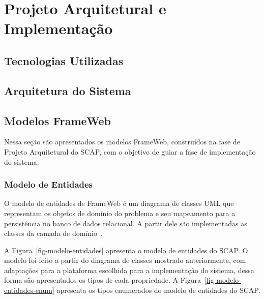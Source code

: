 \chapter{Projeto Arquitetural e Implementação}
\label{chap-projeto}


\section{Tecnologias Utilizadas}
\label{sec-projeto-tecnologias}


\section{Arquitetura do Sistema}
\label{sec-projeto-arquitetura}


\section{Modelos FrameWeb}
\label{sec-projeto-frameweb}

Nessa seção são apresentados os modelos FrameWeb, construídos na fase de Projeto Arquitetural
do SCAP, com o objetivo de guiar a fase de implementação do sistema.

\subsection{Modelo de Entidades}
\label{subsec-frameweb-entidades}
O modelo de entidades de FrameWeb é um diagrama de classes UML que representam
os objetos de domínio do problema e seu mapeamento para a persistência no banco de dados
relacional. A partir dele são implementadas as classes da camada de domínio~\cite{souza:2007}.

A Figura~\ref{fig-modelo-entidades} apresenta o modelo de entidades do SCAP. O modelo foi feito
a partir do diagrama de classes mostrado anteriormente, com adaptações para a plataforma 
escolhida para a implementação do sistema, dessa forma são apresentados os tipos
de cada propriedade. A Figura~\ref{fig-modelo-entidades-enum} apresenta
os tipos enumerados do modelo de entidades do SCAP.

